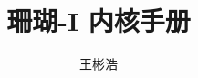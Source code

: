 \documentclass{thesis-uestc}
\title{珊瑚-I 内核手册}{aCoral-I Kernel Manual}
\author{王彬浩}{Wang BinHao}
\begin{document}
\makecover





\thesistableofcontents






\end{document}
